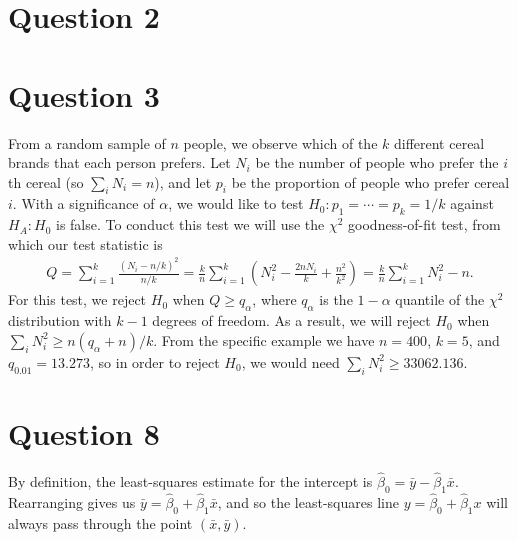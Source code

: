 \documentclass[10pt]{article}
\begin{document}
\section{Question 2} \noindent


\section{Question 3} \noindent
From a random sample of \(n\) people, we observe which of the \(k\) different cereal brands that each person prefers. Let \(N_i\) be the number of people who
prefer the \(i\)th cereal (so \(\sum_i N_i = n\)), and let \(p_i\) be the proportion of people who prefer cereal \(i\). With a significance of \(\alpha\), 
we would like to test 
\(H_0: p_1 = \cdots = p_k = 1/k\) against \(H_A:H_0\) is false. To conduct this test we will use the \(\chi^2\) goodness-of-fit test, 
from which our test statistic is 
\begin{align*}
    Q 
    = \sum_{i = 1}^k \frac{(N_i - n / k)^2}{n / k}
    = \frac{k}{n} \sum_{i=1}^k \left( N_i^2 - \frac{2 n N_i}{k} + \frac{n^2}{k^2} \right)
    = \frac{k}{n} \sum_{i=1}^k N_i^2 - n.
\end{align*}
For this test, we reject \(H_0\) when \(Q \ge q_{\alpha}\), where \(q_{\alpha}\) is the \(1 - \alpha\) quantile of the \(\chi^2\) distribution with \(k - 1\)
degrees of freedom. As a result, we will reject \(H_0\) when \(\sum_i N_i^2 \ge n(q_{\alpha} + n)/k\).
From the specific example we have \(n = 400\), \(k = 5\), and \(q_{0.01} = 13.273\), so in order to reject \(H_0\), we would need 
\(\sum_i N_i^2 \ge 33062.136\).

\section{Question 8} \noindent
By definition, the least-squares estimate for the intercept is \(\hat{\beta}_0 = \bar{y} - \hat{\beta}_1 \bar{x}\).
Rearranging gives us \(\bar{y} = \hat{\beta}_0 + \hat{\beta}_1 \bar{x}\), and so the least-squares line \(y = \hat{\beta}_0 + \hat{\beta}_1 x\) will always 
pass through the point \((\bar{x}, \bar{y})\).
\end{document}
